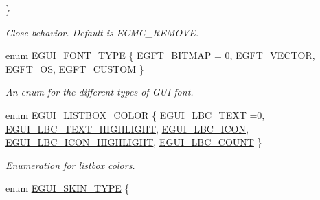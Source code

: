 \begin{DoxyCompactItemize}
 \}\begin{DoxyCompactList}\small\item\em Close behavior. Default is E\+C\+M\+C\+\_\+\+R\+E\+M\+O\+VE. \end{DoxyCompactList}
\item 
enum \hyperlink{namespaceirr_1_1gui_a3c818a164486f43300260327c5420a2f}{E\+G\+U\+I\+\_\+\+F\+O\+N\+T\+\_\+\+T\+Y\+PE} \{ \hyperlink{namespaceirr_1_1gui_a3c818a164486f43300260327c5420a2fad86f0c4d51b44a0429809addc3c9d05d}{E\+G\+F\+T\+\_\+\+B\+I\+T\+M\+AP} = 0, 
\hyperlink{namespaceirr_1_1gui_a3c818a164486f43300260327c5420a2fa0cab3468a45f49475ba3c80484b38e26}{E\+G\+F\+T\+\_\+\+V\+E\+C\+T\+OR}, 
\hyperlink{namespaceirr_1_1gui_a3c818a164486f43300260327c5420a2faccf9d6a070d1826238662909008fde4d}{E\+G\+F\+T\+\_\+\+OS}, 
\hyperlink{namespaceirr_1_1gui_a3c818a164486f43300260327c5420a2fa4ded3de284ca6f02fa0e3cde5d65a8d7}{E\+G\+F\+T\+\_\+\+C\+U\+S\+T\+OM}
 \}\begin{DoxyCompactList}\small\item\em An enum for the different types of G\+UI font. \end{DoxyCompactList}
\item 
enum \hyperlink{namespaceirr_1_1gui_a7da705f0a0b4aa5385e6842adf409cb6}{E\+G\+U\+I\+\_\+\+L\+I\+S\+T\+B\+O\+X\+\_\+\+C\+O\+L\+OR} \{ \newline
\hyperlink{namespaceirr_1_1gui_a7da705f0a0b4aa5385e6842adf409cb6a00c51a89e38d9aa4dd3a7f0ab9789ec1}{E\+G\+U\+I\+\_\+\+L\+B\+C\+\_\+\+T\+E\+XT} =0, 
\hyperlink{namespaceirr_1_1gui_a7da705f0a0b4aa5385e6842adf409cb6ac8f655274d39f5db72e2243a48aad74a}{E\+G\+U\+I\+\_\+\+L\+B\+C\+\_\+\+T\+E\+X\+T\+\_\+\+H\+I\+G\+H\+L\+I\+G\+HT}, 
\hyperlink{namespaceirr_1_1gui_a7da705f0a0b4aa5385e6842adf409cb6ad8ffd444884e984f5a3c47225643c3d9}{E\+G\+U\+I\+\_\+\+L\+B\+C\+\_\+\+I\+C\+ON}, 
\hyperlink{namespaceirr_1_1gui_a7da705f0a0b4aa5385e6842adf409cb6ad98993b3b873d7a568b971ab715c47fa}{E\+G\+U\+I\+\_\+\+L\+B\+C\+\_\+\+I\+C\+O\+N\+\_\+\+H\+I\+G\+H\+L\+I\+G\+HT}, 
\newline
\hyperlink{namespaceirr_1_1gui_a7da705f0a0b4aa5385e6842adf409cb6aa6f9aa0147c6a9ec081260ce3f095d55}{E\+G\+U\+I\+\_\+\+L\+B\+C\+\_\+\+C\+O\+U\+NT}
 \}\begin{DoxyCompactList}\small\item\em Enumeration for listbox colors. \end{DoxyCompactList}
\item 
enum \hyperlink{namespaceirr_1_1gui_a7b4619db540cbdf96e81023893b4eca5}{E\+G\+U\+I\+\_\+\+S\+K\+I\+N\+\_\+\+T\+Y\+PE} \{ \newline

\end{DoxyCompactItemize}

